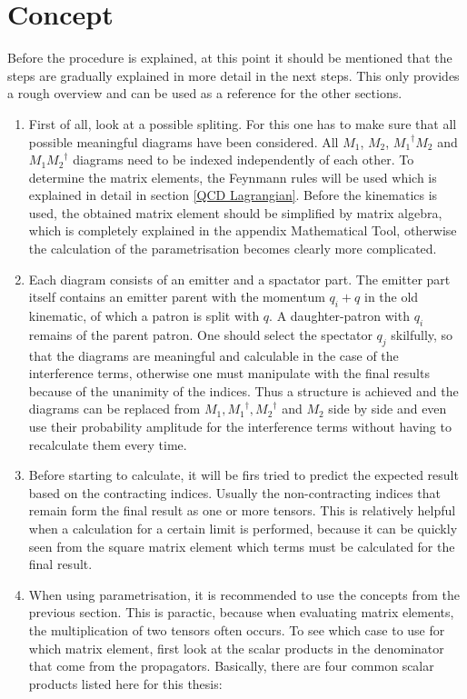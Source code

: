 
\section*{Concept}
\label{Concept}

Before the procedure is explained, at this point it should be mentioned that the steps are gradually explained in more detail in the next steps. This only provides a rough overview and can be used as a reference for the other sections.
\\
\renewcommand{\labelenumi}{\roman{enumi})}
\begin{enumerate}
\item First of all, look at a possible spliting. For this one has to make sure that all possible meaningful diagrams have been considered.
All $ M_1 $, $ M_2 $, $ {M_1}^{\dagger} M_2 $ and $ M_1{M_2}^{\dagger}$ diagrams need to be indexed independently of each other.  To determine the matrix elements, the Feynmann rules will be used which is explained in detail in section \ref{QCD Lagrangian}. Before the kinematics is used, the obtained matrix element should be simplified by matrix algebra, which is completely explained in the appendix Mathematical Tool, otherwise the calculation of the parametrisation becomes clearly more complicated.
\\
\item Each diagram consists of an emitter and a spactator part.
The emitter part itself contains an emitter parent with the momentum $ q_i+q $ in the old kinematic, of which a patron is split with $ q $. A daughter-patron with $ q_i $ remains of the parent patron. One should select the spectator $ q_j $ skilfully, so that the diagrams are meaningful and calculable in the case of the interference terms, otherwise one must manipulate with the final results because of the unanimity of the indices. Thus a structure is achieved and the diagrams can be replaced from $ M_1, {M_1}^{\dagger}, {M_2}^{\dagger}$ and $ M_2 $ side by side and even use their probability amplitude for the interference terms without having to recalculate them every time. 
\\
\item Before starting to calculate, it will be firs tried to predict the expected result based on the contracting indices. Usually the non-contracting indices that remain form the final result as one or more tensors. This is relatively helpful when a calculation for a certain limit is performed, because it can be quickly seen from the square matrix element which terms must be calculated for the final result.
\\
\item When using parametrisation, it is recommended to use the concepts from the previous section. This is paractic, because when evaluating matrix elements, the multiplication of two tensors often occurs. To see which case to use for which matrix element, first look at the scalar products in the denominator that come from the propagators. Basically, there are four common scalar products listed here for this thesis:


\end{enumerate}
